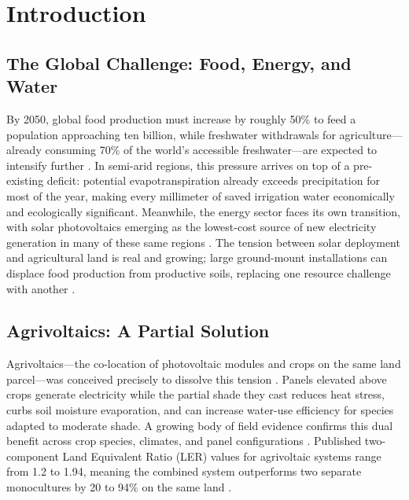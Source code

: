 \documentclass[12pt, a4paper]{article}
\begin{document}
\section{Introduction}

\subsection{The Global Challenge: Food, Energy, and Water}

\hspace{1cm}By 2050, global food production must increase by roughly 50\% to feed a population approaching ten billion, while freshwater withdrawals for agriculture—already consuming 70\% of the world's accessible freshwater—are expected to intensify further \cite{fao2017, scanlon2023}. In semi-arid regions, this pressure arrives on top of a pre-existing deficit: potential evapotranspiration already exceeds precipitation for most of the year, making every millimeter of saved irrigation water economically and ecologically significant. Meanwhile, the energy sector faces its own transition, with solar photovoltaics emerging as the lowest-cost source of new electricity generation in many of these same regions \cite{irena2022}. The tension between solar deployment and agricultural land is real and growing; large ground-mount installations can displace food production from productive soils, replacing one resource challenge with another \cite{dinesh2016}.

\subsection{Agrivoltaics: A Partial Solution}

\hspace{1cm}Agrivoltaics—the co-location of photovoltaic modules and crops on the same land parcel—was conceived precisely to dissolve this tension \cite{dupraz2011, goetzberger1982}. Panels elevated above crops generate electricity while the partial shade they cast reduces heat stress, curbs soil moisture evaporation, and can increase water-use efficiency for species adapted to moderate shade. A growing body of field evidence confirms this dual benefit across crop species, climates, and panel configurations \cite{barron2019, semeraro2024}. Published two-component Land Equivalent Ratio (LER) values for agrivoltaic systems range from 1.2 to 1.94, meaning the combined system outperforms two separate monocultures by 20 to 94\% on the same land \cite{mazzeo2025, riaz2022}.
\end{document}
